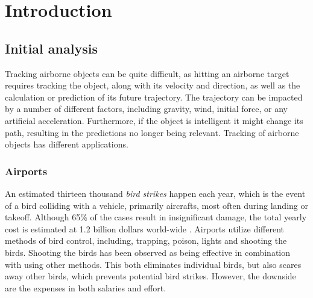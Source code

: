 \chapter{Introduction}
\section{Initial analysis}
Tracking airborne objects can be quite difficult, as hitting an airborne target requires tracking the object, along with its velocity and direction, as well as the calculation or prediction of its future trajectory.
The trajectory can be impacted by a number of different factors, including gravity, wind, initial force, or any artificial acceleration.
Furthermore, if the object is intelligent it might change its path, resulting in the predictions no longer being relevant.
Tracking of airborne objects has different applications.
\subsection{Airports}
An estimated thirteen thousand \textit{bird strikes} happen each year, which is the event of a bird colliding with a vehicle, primarily aircrafts\cite{WildlifeStrikeReport}, most often during landing or takeoff\cite{CostOfBirdstrikes}.
Although 65\% of the cases result in insignificant damage, the total yearly cost is estimated at 1.2 billion dollars world-wide \cite{CostOfBirdstrikes}.
Airports utilize different methods of bird control, including, trapping, poison, lights and shooting the birds\cite{BirdControlAtAirports}.
Shooting the birds has been observed as being effective in combination with using other methods.
This both eliminates individual birds, but also scares away other birds, which prevents potential bird strikes.
However, the downside are the expenses in both salaries and effort.

